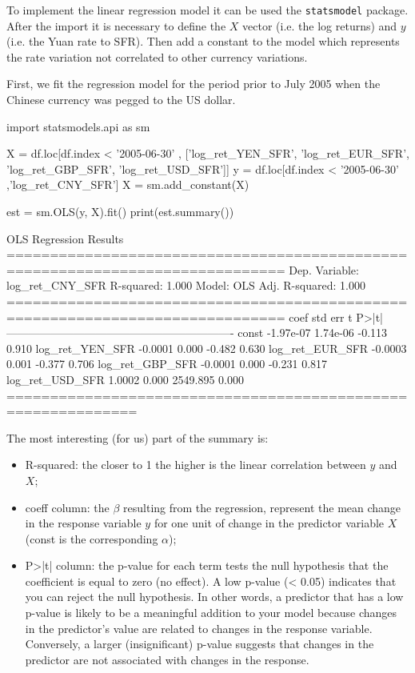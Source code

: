 To implement the linear regression model it can be used the \texttt{statsmodel} package. After the import it is necessary to define the $X$ vector (i.e. the log returns) and $y$ (i.e. the Yuan rate to SFR). Then add a constant to the model which represents the rate variation not correlated to other currency variations.

First, we fit the regression model for the period prior to July 2005 when the Chinese currency was pegged to the US dollar. 

\begin{ipython}
import statsmodels.api as sm

X = df.loc[df.index < '2005-06-30' ,
           ['log_ret_YEN_SFR', 'log_ret_EUR_SFR', 
            'log_ret_GBP_SFR', 'log_ret_USD_SFR']]
y = df.loc[df.index < '2005-06-30' ,'log_ret_CNY_SFR']
X = sm.add_constant(X)

est = sm.OLS(y, X).fit()
print(est.summary())
\end{ipython} 
\begin{ioutput}
                            OLS Regression Results                            
==============================================================================
Dep. Variable:        log_ret_CNY_SFR   R-squared:                       1.000
Model:                            OLS   Adj. R-squared:                  1.000
==============================================================================
                      coef    std err          t      P>|t|
-------------------------------------------------------------
const            -1.97e-07   1.74e-06     -0.113      0.910 
log_ret_YEN_SFR    -0.0001      0.000     -0.482      0.630 
log_ret_EUR_SFR    -0.0003      0.001     -0.377      0.706 
log_ret_GBP_SFR    -0.0001      0.000     -0.231      0.817 
log_ret_USD_SFR     1.0002      0.000   2549.895      0.000 
=============================================================
\end{ioutput} 

The most interesting (for us) part of the summary is: 

\begin{itemize}
\item R-squared: the closer to 1 the higher is the linear correlation between $y$ and $X$;
\item coeff column: the $\beta$ resulting from the regression, represent the mean change in the response variable $y$ for one unit of change in the predictor variable $X$ (const is the corresponding $\alpha$);
\item  P>|t| column: the p-value for each term tests the null hypothesis that the coefficient is equal to zero (no effect). A low p-value (< 0.05) indicates that you can reject the null hypothesis. In other words, a predictor that has a low p-value is likely to be a meaningful addition to your model because changes in the predictor's value are related to changes in the response variable.
Conversely, a larger (insignificant) p-value suggests that changes in the predictor are not associated with changes in the response.
\end{itemize}

